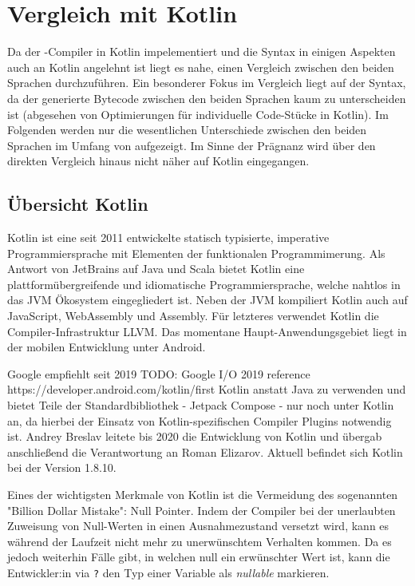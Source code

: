 \chapter{Vergleich mit Kotlin}
\label{cha:comparison}

Da der \toya-Compiler in Kotlin impelementiert und die Syntax in einigen Aspekten auch an Kotlin angelehnt ist liegt es nahe, einen Vergleich zwischen den beiden Sprachen durchzuführen. Ein besonderer Fokus im Vergleich liegt auf der Syntax, da der generierte Bytecode zwischen den beiden Sprachen kaum zu unterscheiden ist (abgesehen von Optimierungen für individuelle Code-Stücke in Kotlin). Im Folgenden werden nur die wesentlichen Unterschiede zwischen den beiden Sprachen im Umfang von \toya aufgezeigt. Im Sinne der Prägnanz wird über den direkten Vergleich hinaus nicht näher auf Kotlin eingegangen.

\section{Übersicht Kotlin}
Kotlin ist eine seit 2011 entwickelte statisch typisierte, imperative Programmiersprache mit Elementen der funktionalen Programmimerung. Als Antwort von JetBrains auf Java und Scala bietet Kotlin eine plattformübergreifende und idiomatische Programmiersprache, welche nahtlos in das JVM Ökosystem eingegliedert ist. Neben der JVM kompiliert Kotlin auch auf JavaScript, WebAssembly und Assembly. Für letzteres verwendet Kotlin die Compiler-Infrastruktur LLVM. Das momentane Haupt-Anwendungsgebiet liegt in der mobilen Entwicklung unter Android.

Google empfiehlt seit 2019 TODO: Google I/O 2019 reference https://developer.android.com/kotlin/first Kotlin anstatt Java zu verwenden und bietet Teile der Standardbibliothek - Jetpack Compose - nur noch unter Kotlin an, da hierbei der Einsatz von Kotlin-spezifischen Compiler Plugins notwendig ist. Andrey Breslav leitete bis 2020 die Entwicklung von Kotlin und übergab anschließend die Verantwortung an Roman Elizarov. Aktuell befindet sich Kotlin bei der Version 1.8.10.

Eines der wichtigsten Merkmale von Kotlin ist die Vermeidung des sogenannten "Billion Dollar Mistake": Null Pointer. Indem der Compiler bei der unerlaubten Zuweisung von Null-Werten in einen Ausnahmezustand versetzt wird, kann es während der Laufzeit nicht mehr zu unerwünschtem Verhalten kommen. Da es jedoch weiterhin Fälle gibt, in welchen null ein erwünschter Wert ist, kann die Entwickler:in via \texttt{?} den Typ einer Variable als \textit{nullable} markieren.

